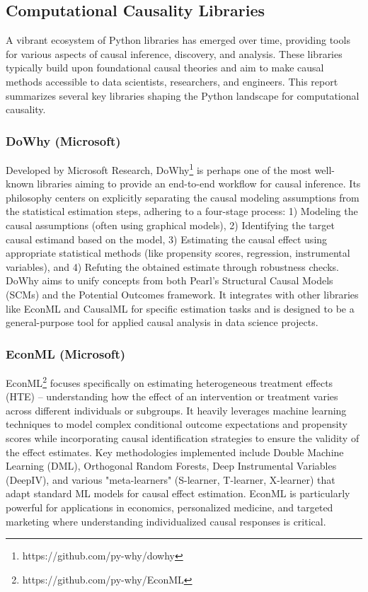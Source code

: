 {\newpage

\subsection{Computational Causality Libraries}

A vibrant ecosystem of Python libraries has emerged over time, providing tools for various aspects of causal inference, discovery, and analysis. These libraries typically build upon foundational causal theories and aim to make causal methods accessible to data scientists, researchers, and engineers. This report summarizes several key libraries shaping the Python landscape for computational causality.

\subsubsection{DoWhy (Microsoft)}

Developed by Microsoft Research, DoWhy\footnote{https://github.com/py-why/dowhy} \cite{sharma2020dowhy} is perhaps one of the most well-known libraries aiming to provide an end-to-end workflow for causal inference. Its philosophy centers on explicitly separating the causal modeling assumptions from the statistical estimation steps, adhering to a four-stage process: 1) Modeling the causal assumptions (often using graphical models), 2) Identifying the target causal estimand based on the model, 3) Estimating the causal effect using appropriate statistical methods (like propensity scores, regression, instrumental variables), and 4) Refuting the obtained estimate through robustness checks. DoWhy aims to unify concepts from both Pearl's Structural Causal Models (SCMs) and the Potential Outcomes framework. It integrates with other libraries like EconML and CausalML for specific estimation tasks and is designed to be a general-purpose tool for applied causal analysis in data science projects.

\subsubsection{EconML (Microsoft)}

EconML\footnote{https://github.com/py-why/EconML} \cite{oprescu2019econml} focuses specifically on estimating heterogeneous treatment effects (HTE) – understanding how the effect of an intervention or treatment varies across different individuals or subgroups. It heavily leverages machine learning techniques to model complex conditional outcome expectations and propensity scores while incorporating causal identification strategies to ensure the validity of the effect estimates. Key methodologies implemented include Double Machine Learning (DML), Orthogonal Random Forests, Deep Instrumental Variables (DeepIV), and various "meta-learners" (S-learner, T-learner, X-learner) that adapt standard ML models for causal effect estimation. EconML is particularly powerful for applications in economics, personalized medicine, and targeted marketing where understanding individualized causal responses is critical.


}
